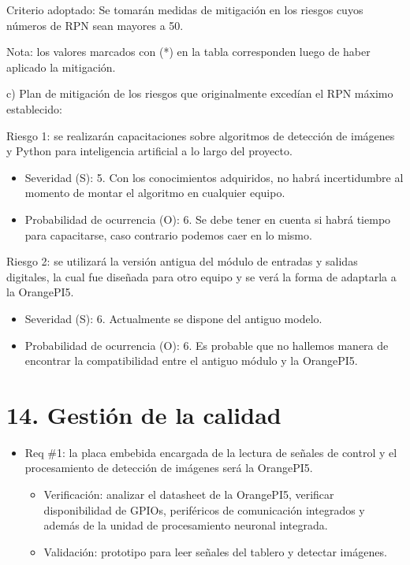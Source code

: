 \documentclass[
11pt, %
]{charter}
\begin{document}
Criterio adoptado: 
Se tomarán medidas de mitigación en los riesgos cuyos números de RPN sean mayores a 50.

Nota: los valores marcados con (*) en la tabla corresponden luego de haber aplicado la mitigación.

c) Plan de mitigación de los riesgos que originalmente excedían el RPN máximo establecido:
 
Riesgo 1: se realizarán capacitaciones sobre algoritmos de detección de imágenes y Python para inteligencia artificial a lo largo del proyecto.
\begin{itemize}
	\item Severidad (S): 5. Con los conocimientos adquiridos, no habrá incertidumbre al momento de montar el algoritmo en cualquier equipo. 
	\item Probabilidad de ocurrencia (O): 6. Se debe tener en cuenta si habrá tiempo para capacitarse, caso contrario podemos caer en lo mismo.
\end{itemize}

Riesgo 2: se utilizará la versión antigua del módulo de entradas y salidas digitales, la cual fue diseñada para otro equipo y se verá la forma de adaptarla a la OrangePI5.
\begin{itemize}
	\item Severidad (S): 6. Actualmente se dispone del antiguo modelo. 
	\item Probabilidad de ocurrencia (O): 6. Es probable que no hallemos manera de encontrar la compatibilidad entre el antiguo módulo y la OrangePI5.
\end{itemize}




\section{14. Gestión de la calidad}
\label{sec:calidad}


\begin{itemize} 
\item Req \#1: la placa embebida encargada de la lectura de señales de control y el procesamiento de detección de imágenes será la OrangePI5.

\begin{itemize}
	\item Verificación: analizar el datasheet de la OrangePI5, verificar disponibilidad de GPIOs, periféricos de comunicación integrados y además de la unidad de procesamiento neuronal integrada. 
	\item Validación: prototipo para leer señales del tablero y detectar imágenes.  
\end{itemize}

\end{itemize}
\end{document}
